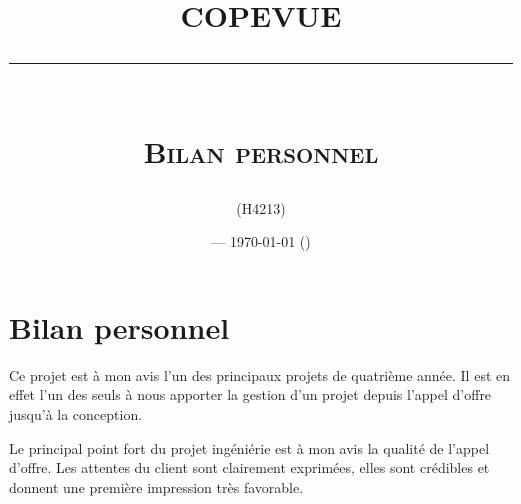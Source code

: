 \documentclass[a4paper, 11pt, final]{article}
\title{\textbf{COPEVUE}\\
\rule{\textwidth}{1pt}{}\\
\Huge{\textsc{Bilan personnel}}}
\author{\docauthor{} (H4213)}
\date{\docname{} --- \today{} (\docstatus{})}
\begin{document}
\maketitle

\section{Bilan personnel}
Ce projet est à mon avis l'un des principaux projets de quatrième
année. Il est en effet l'un des seuls à nous apporter la gestion d'un
projet depuis l'appel d'offre jusqu'à la conception.

Le principal point fort du projet ingéniérie est à mon avis la qualité
de l'appel d'offre. Les attentes du client sont clairement exprimées,
elles sont crédibles et donnent une première impression très
favorable.
\end{document}

